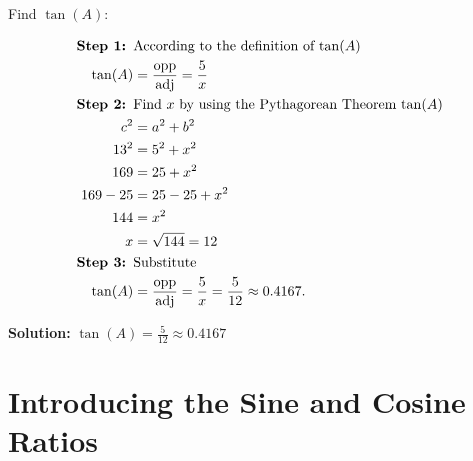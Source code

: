 \begin{exc}
  \label{exc:tangent}

  Find $\tan(A)$:

  \begin{figure}[H]
    \centering


    \label{fig:find_tan_a}
  \end{figure}

  \solution

  \begin{align*}
    \textrm{\textbf{Step 1: }}&\textrm{According to the definition of $\tan(A)$} \\
    \tan(A) &= \frac{\textrm{opp}}{\textrm{adj}} = \frac{5}{x} \\
    \textrm{\textbf{Step 2: }}&\textrm{Find $x$ by using the Pythagorean Theorem $\tan(A)$} \\
    c^{2} &= a^{2} + b^{2} \\
    13^{2} &= 5^{2} + x^{2} \\
    169 &= 25 + x^{2} \\
    169 - 25 &= 25 - 25 + x^{2} \\
    144 &= x^{2} \\
    x &= \sqrt{144} = 12 \\
    \textrm{\textbf{Step 3: }}&\textrm{Substitute} \\
    \tan(A) &= \frac{\textrm{opp}}{\textrm{adj}} = \frac{5}{x} = \frac{5}{12} \approx 0.4167
  .\end{align*}

  \textbf{Solution:} $\tan(A) = \frac{5}{12} \approx  0.4167$
\end{exc}


\section{Introducing the Sine and Cosine Ratios}
\label{sec:introducing_the_sine_and_cosine_ratios}

